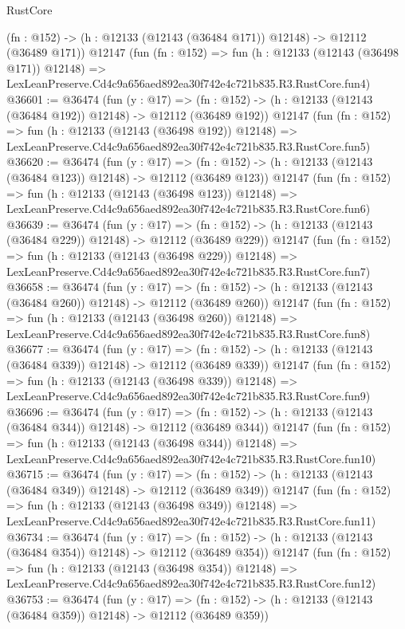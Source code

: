 \begin{lexlean}{RustCore}
\begin{coremodule}
    (fn : @152) -> (h : @12133 (@12143 (@36484 @171)) @12148) -> @12112 (@36489 @171))
    @12147
    (fun (fn : @152) =>
    fun (h : @12133 (@12143 (@36498 @171)) @12148) =>
    LexLeanPreserve.Cd4c9a656aed892ea30f742e4c721b835.R3.RustCore.fun4)
@36601 := @36474
    (fun (y : @17) =>
    (fn : @152) -> (h : @12133 (@12143 (@36484 @192)) @12148) -> @12112 (@36489 @192))
    @12147
    (fun (fn : @152) =>
    fun (h : @12133 (@12143 (@36498 @192)) @12148) =>
    LexLeanPreserve.Cd4c9a656aed892ea30f742e4c721b835.R3.RustCore.fun5)
@36620 := @36474
    (fun (y : @17) =>
    (fn : @152) -> (h : @12133 (@12143 (@36484 @123)) @12148) -> @12112 (@36489 @123))
    @12147
    (fun (fn : @152) =>
    fun (h : @12133 (@12143 (@36498 @123)) @12148) =>
    LexLeanPreserve.Cd4c9a656aed892ea30f742e4c721b835.R3.RustCore.fun6)
@36639 := @36474
    (fun (y : @17) =>
    (fn : @152) -> (h : @12133 (@12143 (@36484 @229)) @12148) -> @12112 (@36489 @229))
    @12147
    (fun (fn : @152) =>
    fun (h : @12133 (@12143 (@36498 @229)) @12148) =>
    LexLeanPreserve.Cd4c9a656aed892ea30f742e4c721b835.R3.RustCore.fun7)
@36658 := @36474
    (fun (y : @17) =>
    (fn : @152) -> (h : @12133 (@12143 (@36484 @260)) @12148) -> @12112 (@36489 @260))
    @12147
    (fun (fn : @152) =>
    fun (h : @12133 (@12143 (@36498 @260)) @12148) =>
    LexLeanPreserve.Cd4c9a656aed892ea30f742e4c721b835.R3.RustCore.fun8)
@36677 := @36474
    (fun (y : @17) =>
    (fn : @152) -> (h : @12133 (@12143 (@36484 @339)) @12148) -> @12112 (@36489 @339))
    @12147
    (fun (fn : @152) =>
    fun (h : @12133 (@12143 (@36498 @339)) @12148) =>
    LexLeanPreserve.Cd4c9a656aed892ea30f742e4c721b835.R3.RustCore.fun9)
@36696 := @36474
    (fun (y : @17) =>
    (fn : @152) -> (h : @12133 (@12143 (@36484 @344)) @12148) -> @12112 (@36489 @344))
    @12147
    (fun (fn : @152) =>
    fun (h : @12133 (@12143 (@36498 @344)) @12148) =>
    LexLeanPreserve.Cd4c9a656aed892ea30f742e4c721b835.R3.RustCore.fun10)
@36715 := @36474
    (fun (y : @17) =>
    (fn : @152) -> (h : @12133 (@12143 (@36484 @349)) @12148) -> @12112 (@36489 @349))
    @12147
    (fun (fn : @152) =>
    fun (h : @12133 (@12143 (@36498 @349)) @12148) =>
    LexLeanPreserve.Cd4c9a656aed892ea30f742e4c721b835.R3.RustCore.fun11)
@36734 := @36474
    (fun (y : @17) =>
    (fn : @152) -> (h : @12133 (@12143 (@36484 @354)) @12148) -> @12112 (@36489 @354))
    @12147
    (fun (fn : @152) =>
    fun (h : @12133 (@12143 (@36498 @354)) @12148) =>
    LexLeanPreserve.Cd4c9a656aed892ea30f742e4c721b835.R3.RustCore.fun12)
@36753 := @36474
    (fun (y : @17) =>
    (fn : @152) -> (h : @12133 (@12143 (@36484 @359)) @12148) -> @12112 (@36489 @359))

\end{coremodule}
\end{lexlean}
